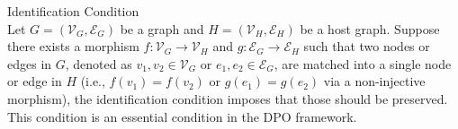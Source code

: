 \begin{definition}{Identification Condition \\}
	Let \(G = (\mathcal{V}_G, \mathcal{E}_G)\) be a graph and \(H = (\mathcal{V}_H, \mathcal{E}_H)\) be a host graph. Suppose there exists a morphism \(f: \mathcal{V}_G \rightarrow \mathcal{V}_H\) and \(g: \mathcal{E}_G \rightarrow \mathcal{E}_H\) such that two nodes or edges in \(G\), denoted as \(v_{1}, v_{2} \in \mathcal{V}_G\) or \(e_{1}, e_{2} \in \mathcal{E}_G\), are matched into a single node or edge in \(H\) (i.e., \(f(v_{1}) = f(v_{2})\) or \(g(e_{1}) = g(e_{2})\) via a non-injective morphism), the identification condition imposes that those should be preserved. This condition is an essential condition in the DPO framework.
\end{definition}


